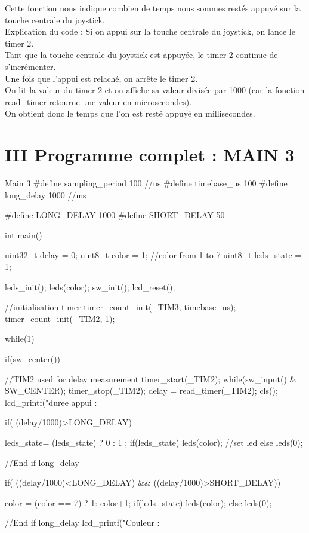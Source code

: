 Cette fonction nous indique combien de temps nous sommes restés appuyé sur la touche centrale du joystick.\\
Explication du code :
Si on appui sur la touche centrale du joystick, on lance le timer 2.\\
Tant que la touche centrale du joystick est appuyée, le timer 2 continue de s'incrémenter.\\
Une fois que l'appui est relaché, on arrête le timer 2.\\
On lit la valeur du timer 2 et on affiche sa valeur divisée par 1000 (car la fonction read\_timer retourne une valeur en microsecondes).\\ On obtient donc le temps que l'on est resté appuyé en millisecondes. 



\newpage
\section{III Programme complet : MAIN 3}
\begin{Cpp}{Main 3} 
#define sampling_period 100         //us
#define timebase_us     100
#define long_delay      1000        //ms

#define LONG_DELAY 1000
#define SHORT_DELAY 50


int main()
{
    uint32_t delay = 0;
    uint8_t color = 1;  //color from 1 to 7
    uint8_t leds_state = 1;

    
    leds_init();
    leds(color);
    sw_init();
    lcd_reset();
    
    //initialisation timer
    timer_count_init(_TIM3, timebase_us);
    timer_count_init(_TIM2, 1);
    
    while(1)
    {

        if(sw_center())
        {
            //TIM2 used for delay measurement
            timer_start(_TIM2);
            while(sw_input() & SW_CENTER);
            timer_stop(_TIM2);
            delay = read_timer(_TIM2);
            cls();
            lcd_printf("duree appui : %

            if( (delay/1000)>LONG_DELAY) {
                leds_state= (leds_state) ? 0 : 1 ;
                if(leds_state) {
                    leds(color);
                }
                //set led
                else {
                    leds(0);
                }

            }//End if long_delay

            if( ((delay/1000)<LONG_DELAY) && ((delay/1000)>SHORT_DELAY)) {
                color = (color == 7) ? 1: color+1;
                if(leds_state) {
                    leds(color);
                }
                else {
                    leds(0);
                }
  
            }//End if long_delay
           lcd_printf("Couleur : %
        }
    }        
}
\end{Cpp}

